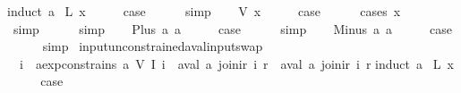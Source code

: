 \begin{isabellebody}
%
\isatagproof
{}\isamarkupfalse%
{\isacharparenleft}induct\ a{\isacharparenright}\isanewline
{}\isamarkupfalse%
\ {\isacharparenleft}L\ x{\isacharparenright}\isanewline
\ \ \isamarkupfalse%
\ \isamarkupfalse%
\ {\isacharquery}case\isanewline
\ \ \ \ \isamarkupfalse%
\ simp\isanewline
{}\isamarkupfalse%
\isanewline
\ \ \isamarkupfalse%
\ {\isacharparenleft}V\ x{\isacharparenright}\isanewline
\ \ \isamarkupfalse%
\ \isamarkupfalse%
\ {\isacharquery}case\isanewline
\ \ \ \ \isamarkupfalse%
\ {\isacharparenleft}cases\ x{\isacharparenright}\isanewline
\ \ \ \ \ \isamarkupfalse%
\ simp\isanewline
\ \ \ \ \isamarkupfalse%
\ simp\isanewline
{}\isamarkupfalse%
\isanewline
\ \ \isamarkupfalse%
\ {\isacharparenleft}Plus\ a{}\ a{}{\isacharparenright}\isanewline
\ \ \isamarkupfalse%
\ \isamarkupfalse%
\ {\isacharquery}case\isanewline
\ \ \ \ \isamarkupfalse%
\ simp\isanewline
{}\isamarkupfalse%
\isanewline
\ \ \isamarkupfalse%
\ {\isacharparenleft}Minus\ a{}\ a{}{\isacharparenright}\isanewline
\ \ \isamarkupfalse%
\ \isamarkupfalse%
\ {\isacharquery}case\isanewline
\ \ \ \ \isamarkupfalse%
\ simp\isanewline
{}\isamarkupfalse%
%
\endisatagproof
{\isafoldproof}%
%
\isadelimproof
\isanewline
%
\endisadelimproof
\isanewline
{}\isamarkupfalse%
\ input{\isacharunderscore}unconstrained{\isacharunderscore}aval{\isacharunderscore}input{\isacharunderscore}swap{\isacharcolon}\isanewline
\ \ {\isachardoublequoteopen}{\isasymforall}i{\isachardot}\ {\isasymnot}\ aexp{\isacharunderscore}constrains\ a\ {\isacharparenleft}V\ {\isacharparenleft}I\ i{\isacharparenright}{\isacharparenright}\ {\isasymLongrightarrow}\ aval\ a\ {\isacharparenleft}join{\isacharunderscore}ir\ i\ r{\isacharparenright}\ {\isacharequal}\ aval\ a\ {\isacharparenleft}join{\isacharunderscore}ir\ i{\isacharprime}\ r{\isacharparenright}{\isachardoublequoteclose}\isanewline
%
\isadelimproof
%
\endisadelimproof
%
\isatagproof
{}\isamarkupfalse%
{\isacharparenleft}induct\ a{\isacharparenright}\isanewline
{}\isamarkupfalse%
\ {\isacharparenleft}L\ x{\isacharparenright}\isanewline
\ \ \isamarkupfalse%
\ \isamarkupfalse%
\ {\isacharquery}case\isanewline

\end{isabellebody}

